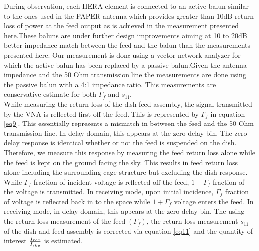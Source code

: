 \documentclass[twocolumn]{emulateapj}
\begin{document}
During observation, each HERA element is connected to an active balun similar to the ones used in the PAPER antenna which provides greater than 10dB return loss of power at the feed output as is achieved in the measurement presented here.These baluns are under further design improvements aiming at 10 to 20dB better impedance match between the feed and the balun than the measurements presented here.  Our measurement is done using a vector network analyzer for which the active balun has been replaced by a passive balun.Given the antenna impedance and the 50 Ohm transmission line the measurements are done using the passive balun with a 4:1 impedance ratio. This measurements are conservative estimate  for both $\Gamma_{f}$ and $s_{11}$.\\
While measuring the return loss of the dish-feed assembly, the signal transmitted by the VNA is reflected first off the feed. This is represented by $\Gamma_{f}$ in equation \ref{eq9}. This essentially represents a mismatch in between the feed and the 50 Ohm transmission line. In delay domain, this appears at the zero delay bin. The zero delay response is identical whether or not the feed is suspended on the dish. Therefore, we measure this response by measuring the feed return loss alone while the feed is kept on the ground facing the sky. This results in feed return loss alone including the surrounding cage structure but excluding the dish response. While $\Gamma_{f}$ fraction of incident voltage is reflected off the feed, $1+\Gamma_{f}$ fraction of the voltage is transmitted. In receiving mode, upon initial incidence, $\Gamma_{f}$ fraction of voltage is reflected back in to the space while $1+\Gamma_{f}$ voltage enters the feed. In receiving mode, in delay domain, this appears at the zero delay bin.
The using the return loss measurement of the feed $(\Gamma_{f})$, the return loss measurement $s_{11}$ of the dish and feed assembly is corrected via equation \ref{eq11} and the quantity of interest ${I_{rec}\over I_{sky}}$ is estimated. 
\end{document}
